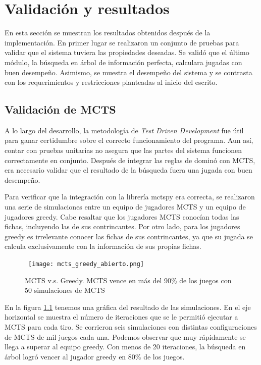 \chapter{Validación y resultados}

\noindent
En esta sección se muestran los resultados obtenidos después de la
implementación. En primer lugar se realizaron un conjunto de pruebas para
validar que el sistema tuviera las propiedades deseadas. Se validó que el último
módulo, la búsqueda en árbol de información perfecta, calculara jugadas con buen
desempeño. Asimismo, se muestra el desempeño del sistema y se contrasta con los
requerimientos y restricciones planteadas al inicio del escrito.

\section{Validación de MCTS}

A lo largo del desarrollo, la metodología de  \textit{Test Driven Development}
fue útil para ganar certidumbre sobre el correcto funcionamiento del programa.
Aun así, contar con pruebas unitarias no asegura que las partes del sistema
funcionen correctamente en conjunto. Después de integrar las reglas de dominó
con MCTS, era necesario validar que el resultado de la búsqueda fuera una jugada
con buen desempeño.

Para verificar que la integración con la librería mctspy era correcta, se
realizaron una serie de simulaciones entre un equipo de jugadores MCTS y un
equipo de jugadores greedy. Cabe resaltar que los jugadores MCTS conocían todas
las fichas, incluyendo las de sus contrincantes. Por otro lado, para los
jugadores greedy es irrelevante conocer las fichas de sus contrincantes, ya que
su jugada se calcula exclusivamente con la información de sus propias fichas.

\begin{figure}[ht]
    \begin{center}
        \hbox{\hspace{-1em} \texttt{[image: mcts\_greedy\_abierto.png]}}
        \caption{MCTS v.s. Greedy. MCTS vence en más del 90\% de los juegos con 50 simulaciones de MCTS}
        \label{MGA}
    \end{center}
\end{figure}

En la figura \ref{MGA} tenemos una gráfica del resultado de las simulaciones. En
el eje horizontal se muestra el número de iteraciones que se le permitió
ejecutar a MCTS para cada tiro. Se corrieron seis simulaciones con distintas
configuraciones de MCTS de mil juegos cada una. Podemos observar que muy
rápidamente se llega a superar al equipo greedy. Con menos de 20 iteraciones, la
búsqueda en árbol logró vencer al jugador greedy en 80\% de los juegos.

